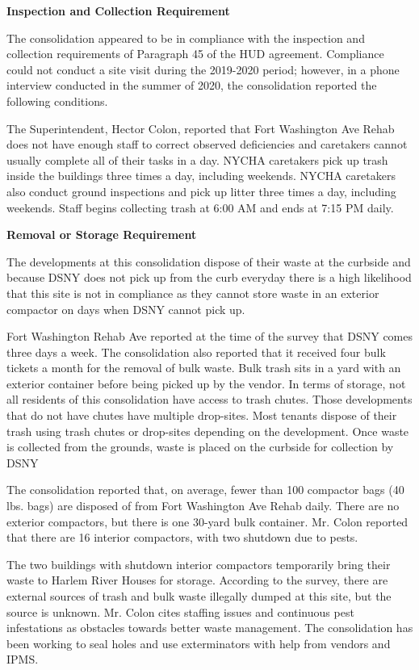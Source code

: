 

\textbf{Inspection and Collection Requirement}

The consolidation appeared to be in compliance with the inspection and collection requirements of Paragraph 45 of the HUD agreement. Compliance could not conduct a site visit during the 2019-2020 period; however, in a phone interview conducted in the summer of 2020, the consolidation reported the following conditions.

The Superintendent, Hector Colon, reported that Fort Washington Ave Rehab does not have enough staff to correct observed deficiencies and caretakers cannot usually complete all of their tasks in a day. NYCHA caretakers pick up trash inside the buildings three times a day, including weekends. NYCHA caretakers also conduct ground inspections and pick up litter three times a day, including weekends. Staff begins collecting trash at 6:00 AM and ends at 7:15 PM daily. 

\textbf{Removal or Storage Requirement}

The developments at this consolidation dispose of their waste at the curbside and because DSNY does not pick up from the curb everyday there is a high likelihood that this site is not in compliance as they cannot store waste in an exterior compactor on days when DSNY cannot pick up.

Fort Washington Rehab Ave reported at the time of the survey that DSNY comes three days a week. The consolidation also reported that it received four bulk tickets a month for the removal of bulk waste. Bulk trash sits in a yard with an exterior container before being picked up by the vendor. In terms of storage, not all residents of this consolidation have access to trash chutes. Those developments that do not have chutes have multiple drop-sites. Most tenants dispose of their trash using trash chutes or drop-sites depending on the development. Once waste is collected from the grounds, waste is placed on the curbside for collection by DSNY

The consolidation reported that, on average, fewer than 100 compactor bags (40 lbs. bags) are disposed of from Fort Washington Ave Rehab daily. There are no exterior compactors, but there is one 30-yard bulk container. Mr. Colon reported that there are 16 interior compactors, with two shutdown due to pests. 

The two buildings with shutdown interior compactors temporarily bring their waste to Harlem River Houses for storage. According to the survey, there are external sources of trash and bulk waste illegally dumped at this site, but the source is unknown. Mr. Colon cites staffing issues and continuous pest infestations as obstacles towards better waste management. The consolidation has been working to seal holes and use exterminators with help from vendors and IPMS. 